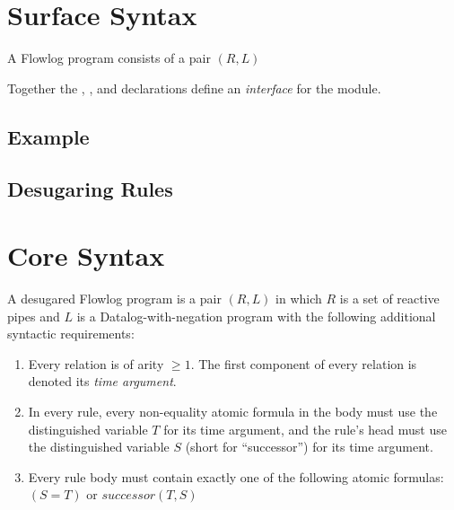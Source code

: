 


\newcommand{\alloyelt}[1]{{\tt #1}}
\newcommand{\alloyterm}[1]{{\tt #1}}
\newcommand{\alloycmd}[1]{{\bf #1}}


\section{Surface Syntax}

A Flowlog program consists of a pair $(R, L)$ 


Together the , , and 
declarations define an \emph{interface} for the module.

\subsection{Example}

\begin{flowlog}


\end{flowlog}





\subsection{Desugaring Rules}




\section{Core Syntax}

A desugared Flowlog program is a pair $(R, L)$ in which $R$ is a set
of reactive pipes and $L$ is a Datalog-with-negation program with
the following additional syntactic requirements:

\begin{enumerate}

\item{Every relation is of arity $\geq 1$. The first component of
  every relation is denoted its \emph{time argument}. }

\item{In every rule, every non-equality atomic formula in the body
  must use the distinguished variable $T$ for its time argument, and
  the rule's head must use the distinguished variable $S$ (short for
  ``successor'') for its time argument.}

\item{Every rule body must contain exactly one of the following atomic
  formulas: $(S = T)$ or $successor(T, S)$}

\end{enumerate}

